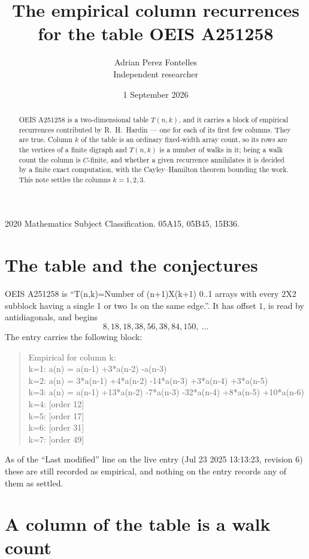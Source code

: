 \documentclass[11pt,a4paper]{article}
\title{The empirical column recurrences for the table OEIS A251258}
\author{Adrian Perez Fontelles\\ \small Independent researcher}
\date{1 September 2026}
\theoremstyle{plain}
\theoremstyle{definition}
\begin{document}
\maketitle

\begin{abstract}
OEIS A251258 is a two-dimensional table $T(n,k)$, and it carries a block of empirical
recurrences contributed by R.~H.~Hardin --- one for each of its first few columns. They are
true. Column $k$ of the table is an ordinary fixed-width array count, so its rows are the
vertices of a finite digraph and $T(n,k)$ is a number of walks in it; being a walk count the
column is $C$-finite, and whether a given recurrence annihilates it is decided by a finite
exact computation, with the Cayley--Hamilton theorem bounding the work. This note settles the
columns $k=1, 2, 3$.
\end{abstract}

\noindent\small 2020 Mathematics Subject Classification. 05A15, 05B45, 15B36.\normalsize

\section{The table and the conjectures}

OEIS A251258 is ``T(n,k)=Number of (n+1)X(k+1) 0..1 arrays with every 2X2 subblock having a single 1 or two 1s on the same edge.''. It has offset $1$, is
read by antidiagonals, and begins
\[
8, 18, 18, 38, 56, 38, 84, 150,\ \dots
\]
The entry carries the following block:
\begin{quote}\small
Empirical for column k:\\
k=1: a(n) = a(n-1) +3*a(n-2) -a(n-3)\\
k=2: a(n) = 3*a(n-1) +4*a(n-2) -14*a(n-3) +3*a(n-4) +3*a(n-5)\\
k=3: a(n) = a(n-1) +13*a(n-2) -7*a(n-3) -32*a(n-4) +8*a(n-5) +10*a(n-6)\\
k=4: [order 12]\\
k=5: [order 17]\\
k=6: [order 31]\\
k=7: [order 49]\\
\end{quote}
As of the ``Last modified'' line on the live entry (Jul 23 2025 13:13:23, revision 6) these are still
recorded as empirical, and nothing on the entry records any of them as settled.

\section{A column of the table is a walk count}
\end{document}
